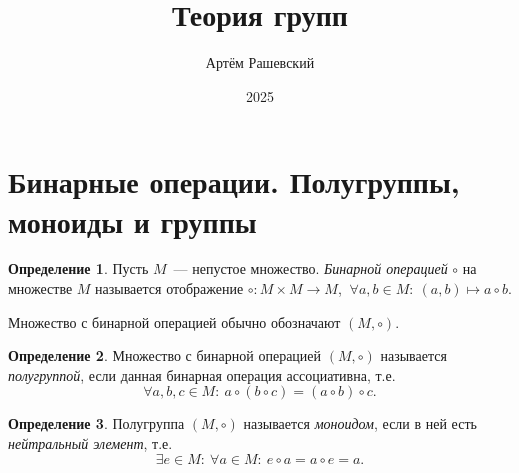 \documentclass[a4paper, 14pt]{extarticle}
\title{Теория групп}
\author{Артём Рашевский}
\date{2025}
\newcommand{\suchthat}{{:}{ } \ }
\theoremstyle{definition}
\newtheorem{definition}{Определение}
\theoremstyle{plain}
\numberwithin{theorem}{section}
\numberwithin{definition}{section}
\numberwithin{statement}{section}
\numberwithin{lemma}{section}
\numberwithin{consequence}{section}
\begin{document}
	
	\maketitle
	\thispagestyle{empty}
	\newpage
	\tableofcontents
	\newpage
	\section{Бинарные операции. Полугруппы, моноиды и группы}
	\begin{definition}
		Пусть $M$~--- непустое множество. \textit{Бинарной операцией} $\circ$ на множестве $M$ называется отображение 
		${\circ : M \times M \rightarrow M}$, ${\ \forall a,b \in M{:} \ (a, b) \mapsto a \circ b}$.
	\end{definition}
	
	Множество с бинарной операцией обычно обозначают $(M, \circ).$
	
	\begin{definition}
		Множество с бинарной операцией $(M, \circ)$ называется \textit{полугруппой}, если данная бинарная операция
		ассоциативна, т.е.
		\begin{equation*}
			\forall a, b, c \in M{:} \ a \circ (b \circ c) = (a \circ b) \circ c.
		\end{equation*}
	\end{definition}
	
	\begin{definition}
		Полугруппа $(M, \circ)$ называется \textit{моноидом}, если в ней есть \textit{нейтральный элемент}, т.е.
		\begin{equation*}
			\exists e \in M \suchthat \forall a \in M{:} \ e \circ a = a \circ e = a.
		\end{equation*}
	\end{definition}
	
\end{document}
